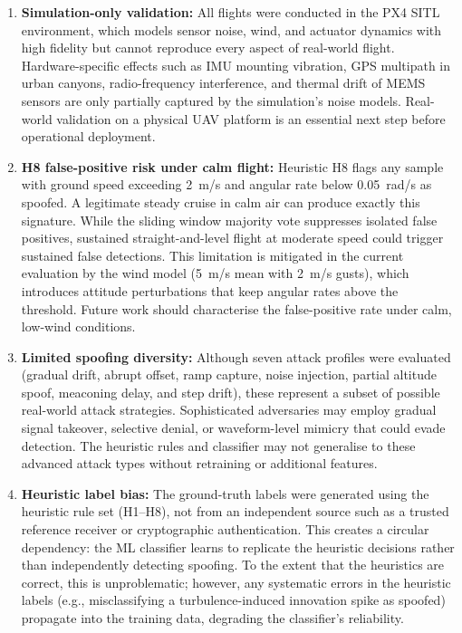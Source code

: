 \documentclass[electronics,article,accept,moreauthors]{Definitions/mdpi}
\begin{document}
\begin{enumerate}
    \item \textbf{Simulation-only validation:} All flights were conducted in the PX4 SITL environment, which models sensor noise, wind, and actuator dynamics with high fidelity but cannot reproduce every aspect of real-world flight. Hardware-specific effects such as IMU mounting vibration, GPS multipath in urban canyons, radio-frequency interference, and thermal drift of MEMS sensors are only partially captured by the simulation's noise models. Real-world validation on a physical UAV platform is an essential next step before operational deployment.
    
    \item \textbf{H8 false-positive risk under calm flight:} Heuristic H8 flags any sample with ground speed exceeding 2~m/s and angular rate below 0.05~rad/s as spoofed. A legitimate steady cruise in calm air can produce exactly this signature. While the sliding window majority vote suppresses isolated false positives, sustained straight-and-level flight at moderate speed could trigger sustained false detections. This limitation is mitigated in the current evaluation by the wind model (5~m/s mean with 2~m/s gusts), which introduces attitude perturbations that keep angular rates above the threshold. Future work should characterise the false-positive rate under calm, low-wind conditions.
    
    \item \textbf{Limited spoofing diversity:} Although seven attack profiles were evaluated (gradual drift, abrupt offset, ramp capture, noise injection, partial altitude spoof, meaconing delay, and step drift), these represent a subset of possible real-world attack strategies. Sophisticated adversaries may employ gradual signal takeover, selective denial, or waveform-level mimicry that could evade detection. The heuristic rules and classifier may not generalise to these advanced attack types without retraining or additional features.
    
    \item \textbf{Heuristic label bias:} The ground-truth labels were generated using the heuristic rule set (H1--H8), not from an independent source such as a trusted reference receiver or cryptographic authentication. This creates a circular dependency: the ML classifier learns to replicate the heuristic decisions rather than independently detecting spoofing. To the extent that the heuristics are correct, this is unproblematic; however, any systematic errors in the heuristic labels (e.g., misclassifying a turbulence-induced innovation spike as spoofed) propagate into the training data, degrading the classifier's reliability.
    

\end{enumerate}
\end{document}
